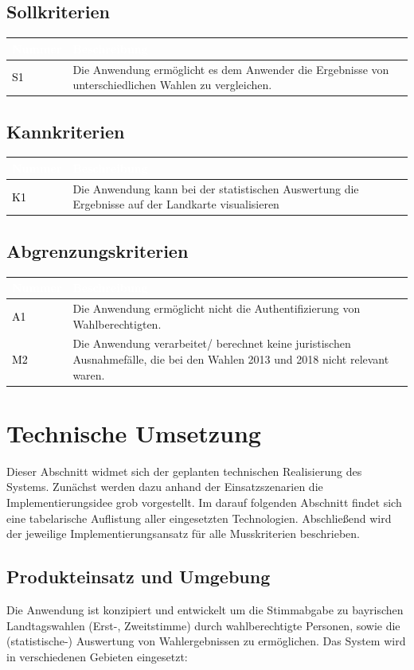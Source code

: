 \documentclass[a4paper,12pt]{article}
\newcommand\addrow[2]{\textcolor{black}{#1} &#2\\ \hline}
\newcommand\addheading[2]{\rowcolor{TUMBlue}\textcolor{white}{#1} & \textcolor{white}{#2}\\ \hline}
\newcommand\tabularhead{\begin{tabular}{|b|p{13cm}|}
\hline
}
\newenvironment{usecase}{\tabularhead}
{\hline\end{tabular}}
\begin{document}
\subsection{Sollkriterien}
\begin{usecase}
	\addheading{Nummer}{Beschreibung} 
	\addrow{S1}{Die Anwendung ermöglicht es dem Anwender die Ergebnisse von unterschiedlichen Wahlen zu vergleichen.}
\end{usecase}
\subsection{Kannkriterien}
\begin{usecase}
	\addheading{Nummer}{Beschreibung} 
	\addrow{K1}{Die Anwendung kann bei der statistischen Auswertung die Ergebnisse auf der Landkarte visualisieren}
\end{usecase}

\subsection{Abgrenzungskriterien}
\begin{usecase}
	\addheading{Nummer}{Beschreibung} 
	\addrow{A1}{Die Anwendung ermöglicht nicht die Authentifizierung von Wahlberechtigten.}
	\addrow{M2}{Die Anwendung verarbeitet/ berechnet keine juristischen Ausnahmefälle, die bei den Wahlen 2013 und 2018 nicht relevant waren.}
	
\end{usecase}


\section{Technische Umsetzung}
Dieser Abschnitt widmet sich der geplanten technischen Realisierung
des Systems. Zunächst werden dazu anhand der Einsatzszenarien die Implementierungsidee
grob vorgestellt. Im darauf folgenden Abschnitt findet sich eine tabelarische 
Auflistung aller eingesetzten Technologien. Abschließend
wird der jeweilige Implementierungsansatz für alle Musskriterien beschrieben.

\subsection{Produkteinsatz und Umgebung}
Die Anwendung ist konzipiert und entwickelt um die Stimmabgabe 
zu bayrischen Landtagswahlen (Erst-, Zweitstimme) durch wahlberechtigte
Personen, sowie die (statistische-) Auswertung von Wahlergebnissen zu ermöglichen. 
%
Das System wird in verschiedenen Gebieten eingesetzt:
\end{document}
